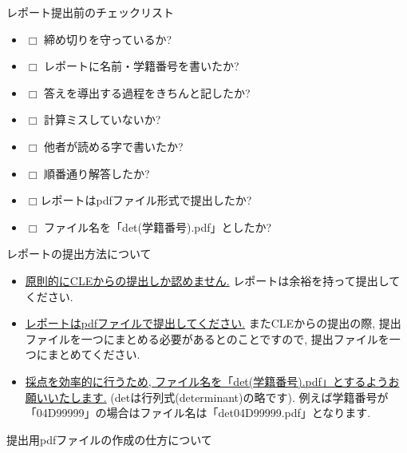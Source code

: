 \documentclass[dvipdfmx,a4paper,11pt]{article}
\theoremstyle{definition}
\begin{document}
 \begin{tcolorbox}[
    colback = white,
    colframe = black,
    fonttitle = \bfseries,
    breakable = true]
    レポート提出前のチェックリスト
    \begin{itemize}
    \item[] $\Box$ 締め切りを守っているか?
    \item[] $\Box$ レポートに名前・学籍番号を書いたか?
     \item[] $\Box$ 答えを導出する過程をきちんと記したか?
     \item[] $\Box$ 計算ミスしていないか?
    \item[] $\Box$ 他者が読める字で書いたか?
    \item[] $\Box$ 順番通り解答したか?
    \item[] $\Box$レポートはpdfファイル形式で提出したか?
   \item[] $\Box$ ファイル名を「det(学籍番号).pdf」としたか?
    \end{itemize}

  \end{tcolorbox}
  
 
\newpage
 \hspace{-11pt}
{\Large  レポートの提出方法について }

\begin{itemize}
\setlength{\parskip}{0cm} %
  \setlength{\itemsep}{0cm}
  \item \underline{原則的にCLEからの提出しか認めません.}
レポートは余裕を持って提出してください.
\item \underline{レポートはpdfファイルで提出してください.}
またCLEからの提出の際, 提出ファイルを一つにまとめる必要があるとのことですので, 提出ファイルを一つにまとめてください.
\item \underline{採点を効率的に行うため, ファイル名を「det(学籍番号).pdf」とするようお願いいたします.}
(detは行列式(determinant)の略です).
例えば学籍番号が「04D99999」の場合はファイル名は「det04D99999.pdf」となります.
\end{itemize}

 \hspace{-11pt}
{\Large 提出用pdfファイルの作成の仕方について}
\vspace{11pt}
\end{document}
